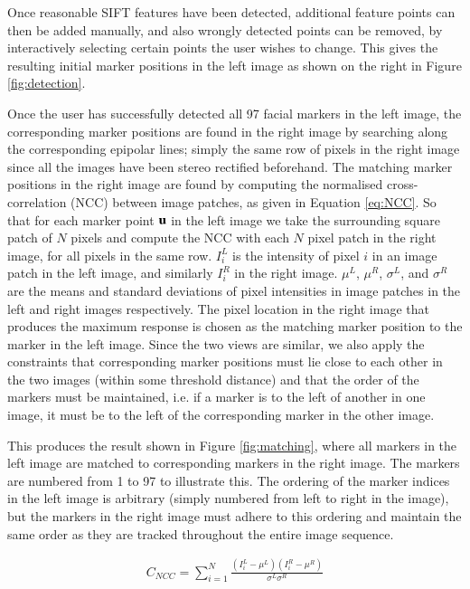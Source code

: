 Once reasonable SIFT features have been detected, additional feature points can then be added manually, and also wrongly detected points can be removed, by interactively selecting certain points the user wishes to change. This gives the resulting initial marker positions in the left image as shown on the right in Figure \ref{fig:detection}. 

Once the user has successfully detected all 97 facial markers in the left image, the corresponding marker positions are found in the right image by searching along the corresponding epipolar lines; simply the same row of pixels in the right image since all the images have been stereo rectified beforehand. The matching marker positions in the right image are found by computing the normalised cross-correlation (NCC) between image patches, as given in Equation \ref{eq:NCC}. So that for each marker point $\mathbf{u}$ in the left image we take the surrounding square patch of $N$ pixels and compute the NCC with each $N$ pixel patch in the right image, for all pixels in the same row. $I_i^L$ is the intensity of pixel $i$ in an image patch in the left image, and similarly $I_i^R$ in the right image. $\mu^L$, $\mu^R$, $\sigma^L$, and $\sigma^R$ are the means and standard deviations of pixel intensities in image patches in the left and right images respectively. The pixel location in the right image that produces the maximum response is chosen as the matching marker position to the marker in the left image. Since the two views are similar, we also apply the constraints that corresponding marker positions must lie close to each other in the two images (within some threshold distance) and that the order of the markers must be maintained, i.e. if a marker is to the left of another in one image, it must be to the left of the corresponding marker in the other image. 

This produces the result shown in Figure \ref{fig:matching}, where all markers in the left image are matched to corresponding markers in the right image. The markers are numbered from 1 to 97 to illustrate this. The ordering of the marker indices in the left image is arbitrary (simply numbered from left to right in the image), but the markers in the right image must adhere to this ordering and maintain the same order as they are tracked throughout the entire image sequence. 

\begin{equation}
\label{eq:NCC}
\begin{aligned}
	C_{NCC} = \sum_{i=1}^N \frac{(I_i^L - \mu^L)(I_i^R - \mu^R)}{\sigma^L \sigma^R}
\end{aligned}
\end{equation}

